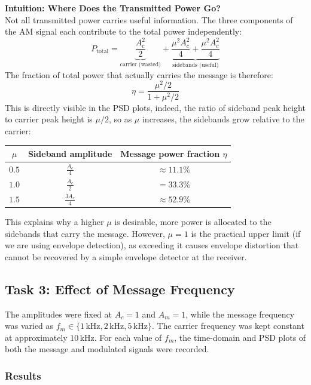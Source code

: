\documentclass[../../main.tex]{subfiles}
\begin{document}
\begin{mdframed}[linewidth=1pt]
\textbf{Intuition: Where Does the Transmitted Power Go?}\\[6pt]
Not all transmitted power carries useful information. The three components of the AM 
signal each contribute to the total power independently:
\[
P_{\text{total}} = \underbrace{\frac{A_c^2}{2}}_{\text{carrier (wasted)}} + \underbrace{\frac{\mu^2 A_c^2}{4} + \frac{\mu^2 A_c^2}{4}}_{\text{sidebands (useful)}}
\]
The fraction of total power that actually carries the message is therefore:
\[
\eta = \frac{\mu^2/2}{1 + \mu^2/2}
\]
This is directly visible in the PSD plots, indeed, the ratio of sideband peak height to 
carrier peak height is $\mu/2$, so as $\mu$ increases, the sidebands grow relative 
to the carrier:
\begin{center}
\begin{tabular}{ccc}
\hline
$\mu$ & Sideband amplitude & Message power fraction $\eta$ \\
\hline
$0.5$ & $\frac{A_c}{4}$ & $\approx 11.1\%$ \\
$1.0$ & $\frac{A_c}{2}$ & $= 33.3\%$ \\
$1.5$ & $\frac{3A_c}{4}$ & $\approx 52.9\%$ \\
\hline
\end{tabular}
\end{center}
This explains why a higher $\mu$ is desirable, more power is allocated to the 
sidebands that carry the message. However, $\mu = 1$ is the practical upper limit (if we are using envelope detection), 
as exceeding it causes envelope distortion that cannot be recovered by a simple 
envelope detector at the receiver.
\end{mdframed}




\subsection{Task 3: Effect of Message Frequency}

The amplitudes were fixed at $A_c=1$ and $A_m=1$, while the message frequency was varied as $f_m \in \{1\,\text{kHz}, 2\,\text{kHz}, 5\,\text{kHz}\}$. The carrier frequency was kept constant at approximately $10\,\text{kHz}$. For each value of $f_m$, the time-domain and PSD plots of both the message and modulated signals were recorded.

\subsubsection*{Results}
\end{document}
